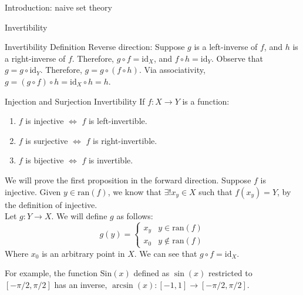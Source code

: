 \documentclass[8pt]{extarticle}
\begin{document}
\begin{problem}{Introduction: naive set theory}
\begin{problem}{Invertibility}
\begin{problem}{Invertibility Definition}
          Reverse direction: Suppose $g$ is a left-inverse of $f$, and $h$ is a right-inverse of $f$. Therefore, $g\circ f = \textrm{id}_X$, and $f\circ h = \textrm{id}_Y$. Observe that $g = g\circ \textrm{id}_Y$. Therefore, $g = g\circ(f\circ h)$. Via associativity, $g = (g\circ f)\circ h = \textrm{id}_X \circ h = h$.
      \end{problem}
      \begin{problem}{Injection and Surjection Invertibility}
        If $f:X\rightarrow Y$ is a function:
        \begin{enumerate}
          \item $f$ is injective $\Leftrightarrow$ $f$ is left-invertible.
          \item $f$ is surjective $\Leftrightarrow$ $f$ is right-invertible.
          \item $f$ is bijective $\Leftrightarrow$ $f$ is invertible.
        \end{enumerate}
        \tcblower
        We will prove the first proposition in the forward direction. Suppose $f$ is injective. Given $y\in \textrm{ran}(f)$, we know that $\exists! x_y\in X$ such that $f(x_y) = Y$, by the definition of injective.\\

        Let $g:Y\rightarrow X$. We will define $g$ as follows:
        \[
          g(y) = \begin{cases}
            x_y & y\in \textrm{ran}(f) \\
            x_0 & y\notin \textrm{ran}(f)
          \end{cases}
        \] 
        Where $x_0$ is an arbitrary point in $X$. We can see that $g\circ f = \textrm{id}_X$.
      \end{problem}
      For example, the function $\textrm{Sin}(x)$ defined as $\sin(x)$ restricted to $[-\pi/2,\pi/2]$ has an inverse, $\arcsin(x):[-1,1] \rightarrow [-\pi/2,\pi/2]$.
    \end{problem}
  \end{problem}
\end{document}
